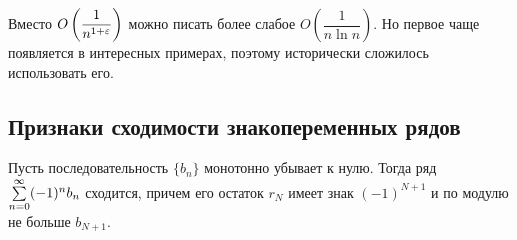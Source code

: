 \documentclass[a4paper, 12pt]{article}
\begin{document}
\begin{Comment}
Вместо $O\left(\dfrac{1}{n^{1+\varepsilon}} \right)$ можно писать более слабое $O\left(
\dfrac{1}{n\ln n} \right)$. Но первое чаще появляется в интересных примерах, поэтому исторически сложилось использовать его.
\end{Comment}

\subsection{Признаки сходимости знакопеременных рядов}
\begin{Test}
Пусть последовательность $\{b_n\}$ монотонно убывает к нулю. Тогда ряд $\sum\limits_{n=0}^{\infty}(-1)^nb_n$ сходится, причем его остаток $r_N$ имеет знак $(-1)^{N+1}$ и по модулю не больше $b_{N+1}$.
\end{Test}
\end{document}
